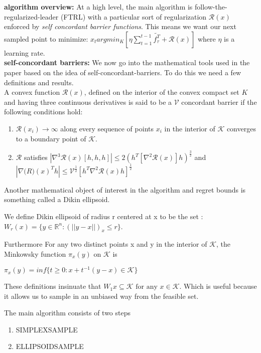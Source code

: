\textbf{algorithm overview:}
At a high level, the main algorithm is follow-the-regularized-leader (FTRL) with a particular
sort of regularization  $\mathcal{R}(x)$ enforced by \textit{self concordant barrier functions}. This means we want our next sampled point 
to minimize:  $x_t  argmin_{K}[\eta \sum_{t=1}^{t-1} \tilde{f_{\tau}^T} + \mathcal{R}(x)]$ where $\eta$ is a learning rate. \\

\textbf{self-concordant barriers:}
We now go into the mathematical tools used in the paper based on the idea of self-concordant-barriers. To do this we need a few definitions and results.\\

A convex function $\mathcal{R}(x)$,  defined on the interior of the convex compact set $K$ and having three continuous derivatives is said to be a $\mathcal{V}$ concordant barrier if the following 
conditions hold:

\begin{enumerate}
\item
  $\mathcal{R}(x_i) \rightarrow \infty$ along every sequence of points $x_i$ in the interior of $\mathcal{K}$ converges to a boundary point of $\mathcal{K}$.

\item
$\mathcal{R}$ satisfies $|\nabla^3 \mathcal{R}(x) [h, h, h]| \leq 2(h^T [\nabla^2 \mathcal{R}(x)]h)^{\frac{3}{2}}$ and $|\nabla \mathcal(R)(x)^T h| \leq \mathcal{V}^{\frac{1}{2}}[h^T \nabla^2 \mathcal{R}(x) h]^\frac{1}{2}$

\end{enumerate}

Another mathematical object of interest in the algorithm
and regret bounds is something called a Dikin ellipsoid.

We define Dikin ellipsoid of radius r centered at x to be the set :
$W_r(x) = \{ y \in  \mathbb{R}^n : (||y - x||)_x \leq r \}$.

Furthermore For any two distinct points x and y in the interior of $\mathcal{K}$,   the Minkowsky
function $\pi_x(y)$ on $\mathcal{K}$ is 

$\pi_x(y) = inf \{t \geq 0 : x + t^{-1}(y - x) \in \mathcal{K} \}$

These definitions insinuate that $W_1{x} \subseteq \mathcal{K} \text{ for any } x \in \mathcal{K}$. Which 
is useful because it allows us  to sample in an unbiased way from the feasible set.

The main algorithm consists of two steps 
\begin{enumerate}
\item
  SIMPLEXSAMPLE
\item
  ELLIPSOIDSAMPLE
\end{enumerate}

